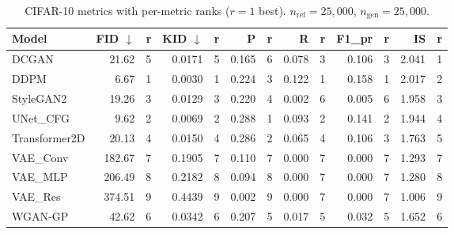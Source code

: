 \begin{table}[H]
\centering
\small
\caption{CIFAR-10 metrics with per-metric ranks ($r{=}1$ best). $n_{\text{ref}}{=}25{,}000$, $n_{\text{gen}}{=}25{,}000$.}
\label{tab:cifar10-ranked}
\begin{tabular}{lrrrrrrrrrrrr}
\toprule
\textbf{Model} & \textbf{FID} $\downarrow$ & \textbf{r} & \textbf{KID} $\downarrow$ & \textbf{r} & \textbf{P} & \textbf{r} & \textbf{R} & \textbf{r} & \textbf{F1\_pr} & \textbf{r} & \textbf{IS} & \textbf{r} \\
\midrule
DCGAN         & 21.62 & 5 & 0.0171 & 5 & 0.165 & 6 & 0.078 & 3 & 0.106 & 3 & 2.041 & 1 \\
DDPM          &  6.67 & 1 & 0.0030 & 1 & 0.224 & 3 & 0.122 & 1 & 0.158 & 1 & 2.017 & 2 \\
StyleGAN2     & 19.26 & 3 & 0.0129 & 3 & 0.220 & 4 & 0.002 & 6 & 0.005 & 6 & 1.958 & 3 \\
UNet\_CFG     &  9.62 & 2 & 0.0069 & 2 & 0.288 & 1 & 0.093 & 2 & 0.141 & 2 & 1.944 & 4 \\
Transformer2D & 20.13 & 4 & 0.0150 & 4 & 0.286 & 2 & 0.065 & 4 & 0.106 & 3 & 1.763 & 5 \\
VAE\_Conv     & 182.67 & 7 & 0.1905 & 7 & 0.110 & 7 & 0.000 & 7 & 0.000 & 7 & 1.293 & 7 \\
VAE\_MLP      & 206.49 & 8 & 0.2182 & 8 & 0.094 & 8 & 0.000 & 7 & 0.000 & 7 & 1.280 & 8 \\
VAE\_Res      & 374.51 & 9 & 0.4439 & 9 & 0.002 & 9 & 0.000 & 7 & 0.000 & 7 & 1.006 & 9 \\
WGAN-GP        &  42.62 & 6 & 0.0342 & 6 & 0.207 & 5 & 0.017 & 5 & 0.032 & 5 & 1.652 & 6 \\
\bottomrule
\end{tabular}
\end{table}

